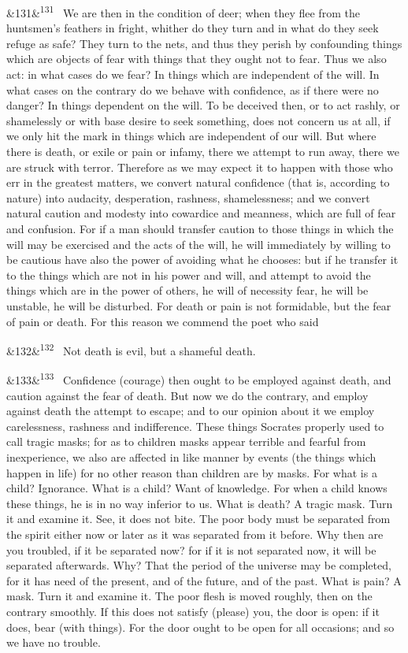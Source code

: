\documentclass[12pt]{article}
\newcommand{\para}[1][]{\par\noindent\ifx&#1&\else\textsuperscript{\footnotesize #1}~\fi}
\begin{document}
\para[131] We are then in the condition of deer; when they flee from the huntsmen's feathers in fright, whither do they turn and in what do they seek refuge as safe? They turn to the nets, and thus they perish by confounding things which are objects of fear with things that they ought not to fear. Thus we also act: in what cases do we fear? In things which are independent of the will. In what cases on the contrary do we behave with confidence, as if there were no danger? In things dependent on the will. To be deceived then, or to act rashly, or shamelessly or with base desire to seek something, does not concern us at all, if we only hit the mark in things which are independent of our will. But where there is death, or exile or pain or infamy, there we attempt to run away, there we are struck with terror. Therefore as we may expect it to happen with those who err in the greatest matters, we convert natural confidence (that is, according to nature) into audacity, desperation, rashness, shamelessness; and we convert natural caution and modesty into cowardice and meanness, which are full of fear and confusion. For if a man should transfer caution to those things in which the will may be exercised and the acts of the will, he will immediately by willing to be cautious have also the power of avoiding what he chooses: but if he transfer it to the things which are not in his power and will, and attempt to avoid the things which are in the power of others, he will of necessity fear, he will be unstable, he will be disturbed. For death or pain is not formidable, but the fear of pain or death. For this reason we commend the poet who said

\para[132] Not death is evil, but a shameful death.

\para[133] Confidence (courage) then ought to be employed against death, and caution against the fear of death. But now we do the contrary, and employ against death the attempt to escape; and to our opinion about it we employ carelessness, rashness and indifference. These things Socrates properly used to call tragic masks; for as to children masks appear terrible and fearful from inexperience, we also are affected in like manner by events (the things which happen in life) for no other reason than children are by masks. For what is a child? Ignorance. What is a child? Want of knowledge. For when a child knows these things, he is in no way inferior to us. What is death? A tragic mask. Turn it and examine it. See, it does not bite. The poor body must be separated from the spirit either now or later as it was separated from it before. Why then are you troubled, if it be separated now? for if it is not separated now, it will be separated afterwards. Why? That the period of the universe may be completed, for it has need of the present, and of the future, and of the past. What is pain? A mask. Turn it and examine it. The poor flesh is moved roughly, then on the contrary smoothly. If this does not satisfy (please) you, the door is open: if it does, bear (with things). For the door ought to be open for all occasions; and so we have no trouble.
\end{document}
